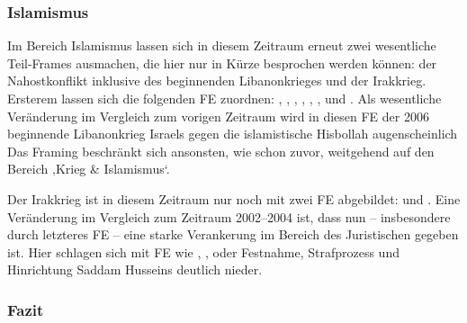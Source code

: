 \subsubsection{Islamismus}\label{islamismus-2}

Im Bereich Islamismus lassen sich in diesem Zeitraum erneut zwei wesentliche Teil-Frames ausmachen, die hier nur in Kürze besprochen werden können: der Nahostkonflikt inklusive des beginnenden Libanonkrieges und der Irakkrieg. Ersterem lassen sich die folgenden FE zuordnen: , , , , , ,  und . Als wesentliche Veränderung im Vergleich zum vorigen Zeitraum wird in diesen FE der 2006 beginnende Libanonkrieg Israels gegen die islamistische Hisbollah augenscheinlich Das Framing beschränkt sich ansonsten, wie schon zuvor, weitgehend auf den Bereich ‚Krieg \& Islamismus`.
\largerpage[-1]

Der Irakkrieg ist in diesem Zeitraum nur noch mit zwei FE abgebildet:  und . Eine Veränderung im Vergleich zum Zeitraum 2002--2004 ist, dass nun -- insbesondere durch letzteres FE -- eine starke Verankerung im Bereich des Juristischen gegeben ist. Hier schlagen sich mit FE wie , ,  oder  Festnahme, Strafprozess und Hinrichtung Saddam Husseins deutlich nieder.

\subsubsection{Fazit}\label{fazit-2}

